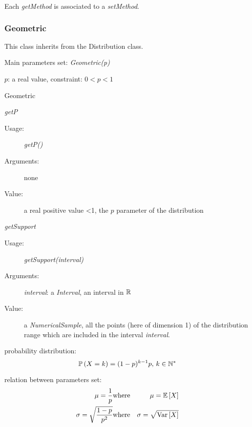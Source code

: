 Each  \textit{getMethod}  is associated to a \textit{setMethod}.

\newpage
\subsubsection{Geometric}

This class inherits from the Distribution class.

\begin{description}

\item[Usage:] Main parameters set: \textit{Geometric(p)}

\item[Arguments:]  $p$: a real value,
constraint: $0<p<1$

\item[Value:] Geometric

\item[Some methods:] \rule{0pt}{1em}
\begin{description}

\item \textit{getP}
\begin{description}
\item[Usage:] \textit{getP()}
\item[Arguments:] none
\item[Value:]  a real positive value <1, the $p$ parameter of the  distribution
\end{description}
\bigskip

\item \textit{getSupport}
\begin{description}
\item[Usage:] \textit{getSupport(interval)}
\item[Arguments:] \textit{interval}: a \textit{Interval}, an interval in ${\mathbb R}$
\item[Value:]  a \textit{NumericalSample}, all the points (here of dimension 1) of the distribution range which are included in the interval \textit{interval}.
\end{description}

\end{description}

\item[Details:]  \rule{0pt}{1em}
\begin{description}
\item probability distribution:
\begin{equation}
{\mathbb P}\left( X=k \right)  = (1-p)^{k-1} p, \, k\in {\mathbb N}^*
\end{equation}
\item relation between parameters set:
\begin{eqnarray*}
\mu  =   \frac{1}{p}                                              & \mbox{where}& \mu ={\mathbb E}\left[ X \right] \\
\sigma  = \sqrt{\frac{1-p}{p^2}}  & \mbox{where}& \sigma =\sqrt{{\rm Var}\left[ X \right] }
\end{eqnarray*}


\end{description}
\end{description}
